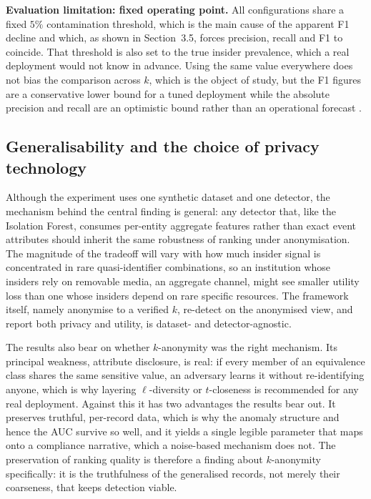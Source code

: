 \documentclass[10pt,a4paper]{article}
\begin{document}
\noindent\textbf{Evaluation limitation: fixed operating point.} All configurations share a fixed $5\%$ contamination threshold, which is the main cause of the apparent F1 decline and which, as shown in Section~3.5, forces precision, recall and F1 to coincide. That threshold is also set to the true insider prevalence, which a real deployment would not know in advance. Using the same value everywhere does not bias the comparison across $k$, which is the object of study, but the F1 figures are a conservative lower bound for a tuned deployment while the absolute precision and recall are an optimistic bound rather than an operational forecast \cite{sommer2010}.

\subsection{Generalisability and the choice of privacy technology}
\label{sec:generalis}
Although the experiment uses one synthetic dataset and one detector, the mechanism behind the central finding is general: any detector that, like the Isolation Forest, consumes per-entity aggregate features rather than exact event attributes should inherit the same robustness of ranking under anonymisation. The magnitude of the tradeoff will vary with how much insider signal is concentrated in rare quasi-identifier combinations, so an institution whose insiders rely on removable media, an aggregate channel, might see smaller utility loss than one whose insiders depend on rare specific resources. The framework itself, namely anonymise to a verified $k$, re-detect on the anonymised view, and report both privacy and utility, is dataset- and detector-agnostic.

The results also bear on whether $k$-anonymity was the right mechanism. Its principal weakness, attribute disclosure, is real: if every member of an equivalence class shares the same sensitive value, an adversary learns it without re-identifying anyone, which is why layering $\ell$-diversity or $t$-closeness is recommended for any real deployment. Against this it has two advantages the results bear out. It preserves truthful, per-record data, which is why the anomaly structure and hence the AUC survive so well, and it yields a single legible parameter that maps onto a compliance narrative, which a noise-based mechanism does not. The preservation of ranking quality is therefore a finding about $k$-anonymity specifically: it is the truthfulness of the generalised records, not merely their coarseness, that keeps detection viable.
\end{document}
